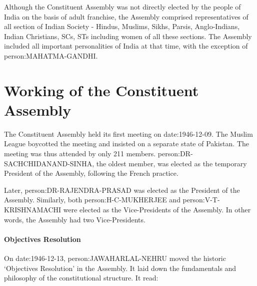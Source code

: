 \begin{multicol}{2}
Although the Constituent Assembly was not directly elected by the people of India on the basis of adult franchise, the Assembly comprised representatives of all section of Indian Society - Hindus, Muslims, Sikhs, Parsis, Anglo-Indians, Indian Christians, SCs, STs including women of all these sections. The Assembly included all important personalities of India at that time, with the exception of \gls{person:MAHATMA-GANDHI}.

\section{Working of the Constituent Assembly}

The Constituent Assembly held its first meeting on \gls{date:1946-12-09}. The Muslim League boycotted the meeting and insisted on a separate state of Pakistan. The meeting was thus attended by only 211 members. {\gls{person:DR-SACHCHIDANAND-SINHA}, the oldest member, was elected as the temporary President of the Assembly, following the French practice.}

Later, \gls{person:DR-RAJENDRA-PRASAD} was elected as the President of the Assembly. Similarly, both \gls{person:H-C-MUKHERJEE} and \gls{person:V-T-KRISHNAMACHI} were elected as the Vice-Presidents of the Assembly. In other words, the Assembly had two Vice-Presidents.

\paragraph{Objectives Resolution}

On \gls{date:1946-12-13}, \gls{person:JAWAHARLAL-NEHRU} moved the historic `Objectives Resolution' in the Assembly. It laid down the fundamentals and philosophy of the constitutional structure. It read:


\end{multicol}
